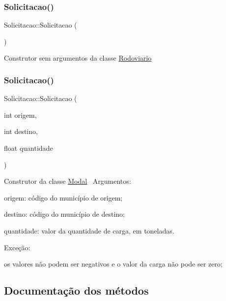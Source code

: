 \subsubsection{\texorpdfstring{Solicitacao()}{Solicitacao()}\hspace{0.1cm}{\footnotesize\ttfamily [1/2]}}
{\footnotesize\ttfamily Solicitacao\+::\+Solicitacao (\begin{DoxyParamCaption}{ }\end{DoxyParamCaption})}

Construtor sem argumentos da classe \hyperlink{classRodoviario}{Rodoviario}\mbox{\label{classSolicitacao_a7488a91778013e8666db5f3dde061e2c}} 
\subsubsection{\texorpdfstring{Solicitacao()}{Solicitacao()}\hspace{0.1cm}{\footnotesize\ttfamily [2/2]}}
{\footnotesize\ttfamily Solicitacao\+::\+Solicitacao (\begin{DoxyParamCaption}\item[{int}]{origem,  }\item[{int}]{destino,  }\item[{float}]{quantidade }\end{DoxyParamCaption})}

Construtor da classe \hyperlink{classModal}{Modal}~\newline
Argumentos\+:
\begin{DoxyItemize}
\item origem\+: código do município de origem;
\item destino\+: código do município de destino;
\item quantidade\+: valor da quantidade de carga, em toneladas.
\end{DoxyItemize}

Exceção\+:
\begin{DoxyItemize}
\item os valores não podem ser negativos e o valor da carga não pode ser zero;
\end{DoxyItemize}

\subsection{Documentação dos métodos}
\mbox{\label{classSolicitacao_a8448e5d5b0ca18b7e8ff022415ec6836}} 

